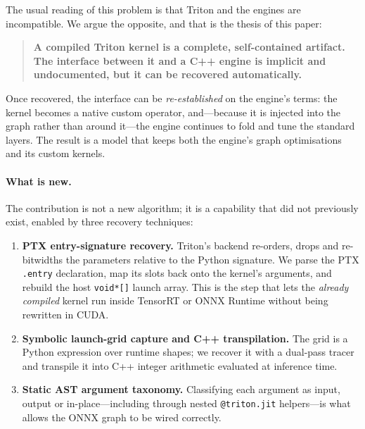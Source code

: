 \documentclass[11pt,a4paper]{article}
\begin{document}
The usual reading of this problem is that Triton and the engines are
incompatible. We argue the opposite, and that is the thesis of this paper:

\begin{quote}
\textbf{A compiled Triton kernel is a complete, self-contained artifact. The
interface between it and a C++ engine is implicit and undocumented, but it can be
recovered automatically.}
\end{quote}

Once recovered, the interface can be \emph{re-established} on the engine's terms:
the kernel becomes a native custom operator, and---because it is injected into
the graph rather than around it---the engine continues to fold and tune the
standard layers. The result is a model that keeps both the engine's graph
optimisations and its custom kernels.

\paragraph{What is new.} The contribution is not a new algorithm; it is a
capability that did not previously exist, enabled by three recovery techniques:

\begin{enumerate}[leftmargin=1.6em]
    \item \textbf{PTX entry-signature recovery.} Triton's backend re-orders,
    drops and re-bitwidths the parameters relative to the Python signature. We
    parse the PTX \texttt{.entry} declaration, map its slots back onto the
    kernel's arguments, and rebuild the host \texttt{void*[]} launch array. This
    is the step that lets the \emph{already compiled} kernel run inside TensorRT
    or ONNX Runtime without being rewritten in CUDA.
    \item \textbf{Symbolic launch-grid capture and C++ transpilation.} The grid
    is a Python expression over runtime shapes; we recover it with a dual-pass
    tracer and transpile it into C++ integer arithmetic evaluated at inference
    time.
    \item \textbf{Static AST argument taxonomy.} Classifying each argument as
    input, output or in-place---including through nested \texttt{@triton.jit}
    helpers---is what allows the ONNX graph to be wired correctly.
\end{enumerate}
\end{document}
